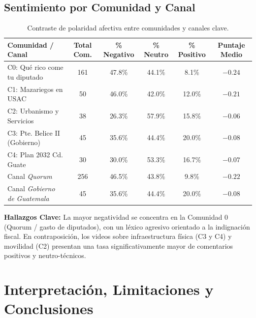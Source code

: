 \documentclass[11pt,a4paper]{article}
\begin{document}
\subsection{Sentimiento por Comunidad y Canal}
\begin{table}[H]
\centering
\small
\begin{tabular}{@{}lccccc@{}}
\toprule
\textbf{Comunidad / Canal} & \textbf{Total Com.} & \textbf{\% Negativo} & \textbf{\% Neutro} & \textbf{\% Positivo} & \textbf{Puntaje Medio} \\
\midrule
C0: Qué rico come tu diputado & 161 & 47.8\% & 44.1\% & 8.1\% & $-0.24$ \\
C1: Mazariegos en USAC & 50 & 46.0\% & 42.0\% & 12.0\% & $-0.21$ \\
C2: Urbanismo y Servicios & 38 & 26.3\% & 57.9\% & 15.8\% & $-0.06$ \\
C3: Pte. Belice II (Gobierno) & 45 & 35.6\% & 44.4\% & 20.0\% & $-0.08$ \\
C4: Plan 2032 Cd. Guate & 30 & 30.0\% & 53.3\% & 16.7\% & $-0.07$ \\
\midrule
Canal \textit{Quorum} & 256 & 46.5\% & 43.8\% & 9.8\% & $-0.22$ \\
Canal \textit{Gobierno de Guatemala} & 45 & 35.6\% & 44.4\% & 20.0\% & $-0.08$ \\
\bottomrule
\end{tabular}
\caption{Contraste de polaridad afectiva entre comunidades y canales clave.}
\label{tab:sentimiento}
\end{table}

\noindent \textbf{Hallazgos Clave:} La mayor negatividad se concentra en la Comunidad 0 (Quorum / gasto de diputados), con un léxico agresivo orientado a la indignación fiscal. En contraposición, los videos sobre infraestructura física (C3 y C4) y movilidad (C2) presentan una tasa significativamente mayor de comentarios positivos y neutro-técnicos.

\section{Interpretación, Limitaciones y Conclusiones}
\end{document}
